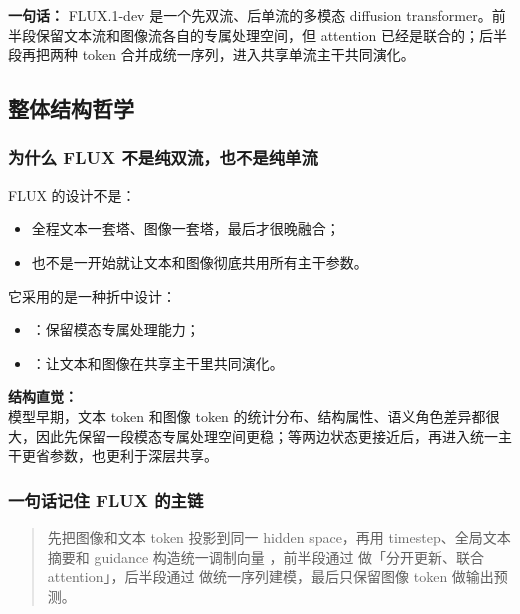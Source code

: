 \begin{conceptbox}
\textbf{一句话：} FLUX.1-dev 是一个先双流、后单流的多模态 diffusion transformer。前半段保留文本流和图像流各自的专属处理空间，但 attention 已经是联合的；后半段再把两种 token 合并成统一序列，进入共享单流主干共同演化。
\end{conceptbox}

\subsection{整体结构哲学}

\subsubsection{为什么 FLUX 不是纯双流，也不是纯单流}

FLUX 的设计不是：

\begin{itemize}[leftmargin=1.5em]
  \item 全程文本一套塔、图像一套塔，最后才很晚融合；
  \item 也不是一开始就让文本和图像彻底共用所有主干参数。
\end{itemize}

它采用的是一种折中设计：

\begin{itemize}[leftmargin=1.5em]
  \item {}：保留模态专属处理能力；
  \item {}：让文本和图像在共享主干里共同演化。
\end{itemize}

\begin{summarybox}
\textbf{结构直觉：}\\
模型早期，文本 token 和图像 token 的统计分布、结构属性、语义角色差异都很大，因此先保留一段模态专属处理空间更稳；等两边状态更接近后，再进入统一主干更省参数，也更利于深层共享。
\end{summarybox}

\subsubsection{一句话记住 FLUX 的主链}

\begin{quote}
先把图像和文本 token 投影到同一 hidden space，再用 timestep、全局文本摘要和 guidance 构造统一调制向量 ，前半段通过  做「分开更新、联合 attention」，后半段通过  做统一序列建模，最后只保留图像 token 做输出预测。
\end{quote}


